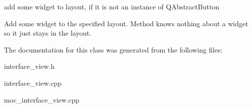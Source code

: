add some widget to layout, if it is not an instance of QAbstractButton 

Add some widget to the specified layout. Method knows nothing about a widget so it just stays in the layout. 

The documentation for this class was generated from the following files:\begin{CompactItemize}
\item 
interface\_\-view.h\item 
interface\_\-view.cpp\item 
moc\_\-interface\_\-view.cpp\end{CompactItemize}
